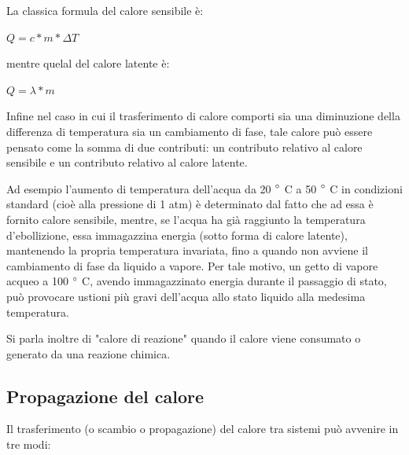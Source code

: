 \documentclass[a4paper]{report}
\begin{document}
    La classica formula del calore sensibile è:
    
    $Q=c*m*{\Delta T}$
    
    mentre quelal del calore latente è:
    
    $Q=\lambda * m$
    
    Infine nel caso in cui il trasferimento di calore comporti sia una diminuzione della differenza di temperatura sia un cambiamento di fase, tale calore può essere pensato come la somma di due contributi: un contributo relativo al calore sensibile e un contributo relativo al calore latente.

    Ad esempio l'aumento di temperatura dell'acqua da 20 $\degree$ C a 50 $\degree$ C in condizioni standard (cioè alla pressione di 1 atm) è determinato dal fatto che ad essa è fornito calore sensibile, mentre, se l'acqua ha già raggiunto la temperatura d'ebollizione, essa immagazzina energia (sotto forma di calore latente), mantenendo la propria temperatura invariata, fino a quando non avviene il cambiamento di fase da liquido a vapore. Per tale motivo, un getto di vapore acqueo a 100 $\degree$ C, avendo immagazzinato energia durante il passaggio di stato, può provocare ustioni più gravi dell'acqua allo stato liquido alla medesima temperatura.

    Si parla inoltre di "calore di reazione" quando il calore viene consumato o generato da una reazione chimica.

\subsection{Propagazione del calore}
    Il trasferimento (o scambio o propagazione) del calore tra sistemi può avvenire in tre modi:
    
\end{document}
